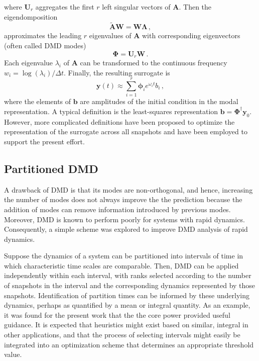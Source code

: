 \documentclass{anstrans}
\renewcommand{\vec}[1]{\bm{#1}} %
\begin{document}
where $\mathbf{U}_r$ aggregates the first $r$  left singular vectors of $\mathbf{A}$.  Then the eigendomposition
\begin{equation}
 \mathbf{\tilde{A}}\mathbf{W} = \mathbf{W}\bm{\Lambda} \, ,
\end{equation}
approximates the leading $r$ eigenvalues of $\mathbf{A}$ with corresponding 
eigenvectors (often called DMD modes)
\begin{equation}
 \bm{\Phi} = \mathbf{U}_r \mathbf{W} \, .
\end{equation}
Each eigenvalue $\lambda_i$ of $\mathbf{A}$ can be transformed to the continuous frequency $w_i=\log(\lambda_i)/\Delta t$.
Finally, the resulting surrogate is
\begin{equation}
 \mathbf{y}(t) \approx \sum^r_{i=1} \bm{\phi}_i e^{\omega_i t} b_i \, ,
\end{equation}
where the elements of $\mathbf{b}$ are amplitudes of the initial condition in the modal representation.  A typical definition is 
the least-squares representation $\mathbf{b}=\bm{\Phi}^{\dagger} \mathbf{y}_0$.  However, more complicated definitions have been proposed to optimize the representation of the surrogate across all snapshots \cite{jovanovic2014sparsity} and have been employed to support the present effort.



\subsection{Partitioned DMD}


A drawback of DMD is that its modes are non-orthogonal, and hence, increasing the number of modes does not always improve the the prediction because the addition of modes can remove information introduced by previous modes.
Moreover, DMD is known to perform poorly for systems with rapid dynamics.  
Consequently, a simple scheme was explored to improve DMD analysis of rapid dynamics.

Suppose the dynamics of a system can be partitioned into intervals of time in which characteristic time scales are comparable.
Then, DMD can be applied independently within each interval, with ranks selected according to the number of snapshots in the interval and the corresponding dynamics represented by those snapshots.
Identification of partition times can be informed by these underlying dynamics, perhaps as quantified by a mean or integral quantity. 
As an example, it was found for the present work that the the core power provided useful guidance.
It is expected that heuristics might exist based on similar, integral in other applications, and that the process of selecting intervals might easily be integrated into an optimization scheme that determines an appropriate threshold value.
\end{document}
